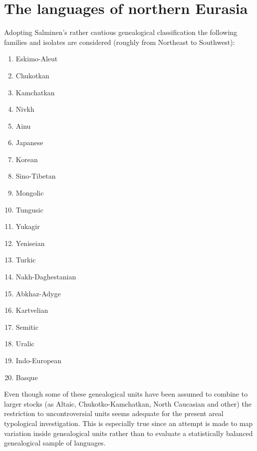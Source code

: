 \section{The languages of northern Eurasia}
Adopting Salminen's rather cautious genealogical classification the following families and isolates are considered (roughly from Northeast to Southwest):
\begin{multicols}{2}
\begin{enumerate}
\item{Eskimo-Aleut}
\item{Chukotkan}
\item{Kamchatkan}
\item{Nivkh}
\item{Ainu}
\item{Japanese}
\item{Korean}
\item{Sino-Tibetan}
\item{Mongolic}
\item{Tungusic}
\item{Yukagir}
\item{Yeniseian}
\item{Turkic}
\item{Nakh-Daghestanian}
\item{Abkhaz-Adyge}
\item{Kartvelian}
\item{Semitic}
\item{Uralic}
\item{Indo-European}
\item{Basque}
\end{enumerate}
\end{multicols}
Even though some of these genealogical units have been assumed to combine to larger stocks (as Altaic, Chukotko-Kamchatkan, North Caucasian and other) the restriction to uncontroversial units seems adequate for the present areal typological investigation. This is especially true since an attempt is made to map variation inside genealogical units rather than to evaluate a statistically balanced genealogical sample of languages.

